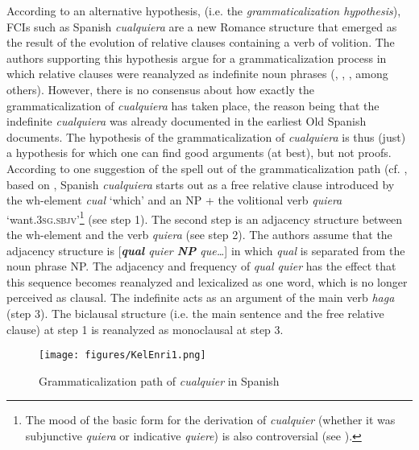 \documentclass[output=paper,colorlinks,citecolor=brown]{langscibook}
\begin{document}
According to an alternative hypothesis, (i.e. the \textit{grammaticalization hypothesis}), FCIs such as Spanish \textit{cualquiera} are a new Romance structure that emerged as the result of the evolution of relative clauses containing a verb of volition. The authors supporting this hypothesis argue for a grammaticalization process in which relative clauses were reanalyzed as indefinite noun phrases (\cite{Palomo1934, Rivero1988, Haspelmath1997, GirónAlconchel2012}, \cite[][§7.5.7]{Brucart1999}, \cite{CompanyCompanyPozasLoyo2009}, among others). However, there is no consensus about how exactly the grammaticalization of \textit{cualquiera} has taken place, the reason being that the indefinite \textit{cualquiera} was already documented in the earliest Old Spanish documents. The hypothesis of the grammaticalization of \textit{cualquiera} is thus (just) a hypothesis for which one can find good arguments (at best), but not proofs. According to one suggestion of the spell out of the grammaticalization path (cf.  , based on \cite[][1086]{CompanyCompanyPozasLoyo2009}, Spanish \textit{cualquiera} starts out as a free relative clause introduced by the wh-element \textit{cual} ‘which’ and an NP + the volitional verb \textit{quiera} ‘want.3\textsc{sg.sbjv}’\footnote{The mood of the basic form for the derivation of \textit{cualquier} (whether it was subjunctive \textit{quiera} or indicative \textit{quiere}) is also controversial (see \cite{Pato2012}).} (see step 1). The second step is an adjacency structure between the wh-element and the verb \textit{quiera} (see step 2). The authors assume that the adjacency structure is [\textit{\textbf{qual} quier \textbf{NP} que…}] in which \textit{qual} is separated from the noun phrase NP. The adjacency and frequency of \textit{qual quier} has the effect that this sequence becomes reanalyzed and lexicalized as one word, which is no longer perceived as clausal. The indefinite acts as an argument of the main verb \textit{haga} (step 3). The biclausal structure (i.e. the main sentence and the free relative clause) at step 1 is reanalyzed as monoclausal at step 3.\largerpage

\begin{figure}
\texttt{[image: figures/KelEnri1.png]}
\caption{Grammaticalization path of \textit{cualquier} in Spanish \citep[][1086]{CompanyCompanyPozasLoyo2009}}
\label{fig:ka1}
\end{figure}
\end{document}

